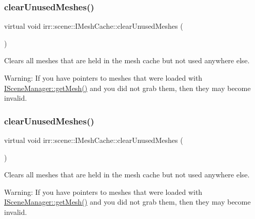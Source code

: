\subsubsection{\texorpdfstring{clear\+Unused\+Meshes()}{clearUnusedMeshes()}\hspace{0.1cm}{\footnotesize\ttfamily [1/2]}}
{\footnotesize\ttfamily virtual void irr\+::scene\+::\+I\+Mesh\+Cache\+::clear\+Unused\+Meshes (\begin{DoxyParamCaption}{ }\end{DoxyParamCaption})\hspace{0.3cm}{\ttfamily [pure virtual]}}



Clears all meshes that are held in the mesh cache but not used anywhere else. 

Warning\+: If you have pointers to meshes that were loaded with \hyperlink{classirr_1_1scene_1_1ISceneManager_a63894c3f3d46cfc385116f1705935e03}{I\+Scene\+Manager\+::get\+Mesh()} and you did not grab them, then they may become invalid. \mbox{\label{classirr_1_1scene_1_1IMeshCache_a9f3e20b8e0f66d59bc454a311d13bbee}} 
\subsubsection{\texorpdfstring{clear\+Unused\+Meshes()}{clearUnusedMeshes()}\hspace{0.1cm}{\footnotesize\ttfamily [2/2]}}
{\footnotesize\ttfamily virtual void irr\+::scene\+::\+I\+Mesh\+Cache\+::clear\+Unused\+Meshes (\begin{DoxyParamCaption}{ }\end{DoxyParamCaption})\hspace{0.3cm}{\ttfamily [pure virtual]}}



Clears all meshes that are held in the mesh cache but not used anywhere else. 

Warning\+: If you have pointers to meshes that were loaded with \hyperlink{classirr_1_1scene_1_1ISceneManager_a63894c3f3d46cfc385116f1705935e03}{I\+Scene\+Manager\+::get\+Mesh()} and you did not grab them, then they may become invalid. \mbox{\label{classirr_1_1scene_1_1IMeshCache_aa3946324e39cc074b1f73e01d57cae70}} 

